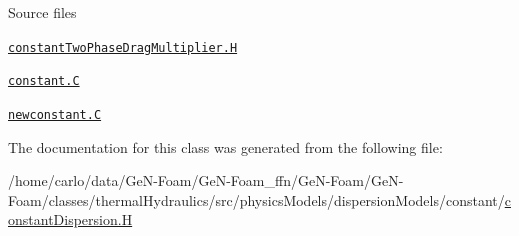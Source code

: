 \begin{DoxyParagraph}{Source files}

\begin{DoxyItemize}
\item \href{../../../home/carlo/data/GeN-Foam/GeN-Foam_ffn/GeN-Foam/GeN-Foam/classes/thermalHydraulics/src/physicsModels/dragModels/twoPhaseDragMultiplierModels/constant/constantTwoPhaseDragMultiplier.H}{\tt constant\+Two\+Phase\+Drag\+Multiplier.\+H} 
\item \href{../../../home/carlo/data/GeN-Foam/GeN-Foam_ffn/GeN-Foam/GeN-Foam/classes/thermalHydraulics/src/physicsModels/dragModels/twoPhaseDragMultiplierModels/constant/constant.C}{\tt constant.\+C} 
\item \href{../../../home/carlo/data/GeN-Foam/GeN-Foam_ffn/GeN-Foam/GeN-Foam/classes/thermalHydraulics/src/physicsModels/dragModels/twoPhaseDragMultiplierModels/constant/newconstant.C}{\tt newconstant.\+C} 
\end{DoxyItemize}
\end{DoxyParagraph}


The documentation for this class was generated from the following file\+:\begin{DoxyCompactItemize}
\item 
/home/carlo/data/\+Ge\+N-\/\+Foam/\+Ge\+N-\/\+Foam\+\_\+ffn/\+Ge\+N-\/\+Foam/\+Ge\+N-\/\+Foam/classes/thermal\+Hydraulics/src/physics\+Models/dispersion\+Models/constant/\hyperlink{constantDispersion_8H}{constant\+Dispersion.\+H}\end{DoxyCompactItemize}

